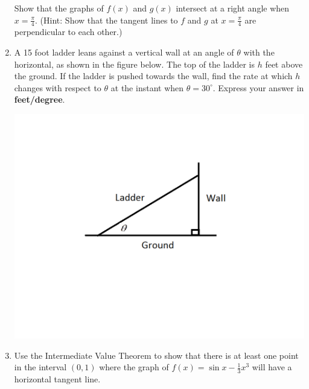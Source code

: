 \documentclass[12pt]{article}
\newif\ifans
\begin{document}
\begin{enumerate}
Show that the graphs of $f(x)$ and $g(x)$ intersect at a right angle when $x=\frac{\pi}{4}$. (Hint: Show that the tangent lines to $f$ and $g$ at $x=\frac{\pi}{4}$ are perpendicular to each other.)

\ifans{\fbox{\parbox{1\linewidth}{$f^{\prime}\left(\frac{\pi}{4}\right)=-1$ and $g^{\prime}\left(\frac{\pi}{4}\right)=1$.  So, the tangent lines to $f$ and $g$ at $x=\frac{\pi}{4}$ are perpendicular to one another since the product of their slopes is $-1$.}}} \fi

\newpage

\item A 15 foot ladder leans against a vertical wall at an angle of $\theta$ with the horizontal, as shown in the figure below.  The top of the ladder is $h$ feet above the ground.  If the ladder is pushed towards the wall, find the rate at which $h$ changes with respect to $\theta$ at the instant when $\theta=30^{\circ }$.  Express your answer in {\bf feet/degree}.

\begin{center}
\includegraphics[scale=0.5]{wall.pdf}
\end{center}

\ifans{\fbox{$\frac{dh}{d\theta}=\frac{15\sqrt{3}}{2} \text{ ft/radian}=\frac{\pi\sqrt{3}}{24} \text{ ft/degree}$}} \fi

\item Use the Intermediate Value Theorem to show that there is at least one point in the interval $(0,1)$ where the graph of $f(x)=\sin{x}-\frac{1}{3}x^3$ will have a horizontal tangent line.


\end{enumerate}
\end{document}
